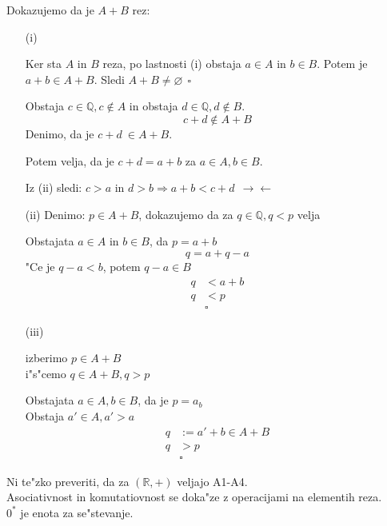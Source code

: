 Dokazujemo da je \(A + B\) rez:
\begin{enumerate}
	\item[(i)] 

	Ker sta \(A\) in \(B\) reza, po lastnosti (i) obstaja \(a \in A\) in \(b \in B\). Potem je \(a + b \in A + B\). Sledi \(A + B \neq \varnothing \ \ \square\)


	Obstaja \(c \in \mathbb{Q}, c \notin A\) in obstaja \(d \in \mathbb{Q}, d \notin B\).
	\[c + d \notin A + B\]
	Denimo, da je \(c + d\ \in A + B\).

	Potem velja, da je \(c + d = a + b\) za \(a \in A, b \in B\).

	Iz (ii) sledi: \(c > a\) in \(d > b \Rightarrow a + b < c + d \ \ \rightarrow\leftarrow\)

	\item[(ii)] Denimo: \(p \in A + B\), dokazujemo da za \(q \in \mathbb{Q}, q < p\) velja 

	Obstajata \(a \in A\) in \(b \in B\), da \(p = a + b\)
	\[q = a + q - a\]
	"Ce je \(q - a < b\), potem \(q - a \in B\)
	\begin{align*}
		q &< a + b\\
		q &< p\\
		&\square
	\end{align*}

	\item[(iii)] 

	izberimo \(p \in A + B\)\\
	i"s"cemo \(q \in A + B, q > p\)

	Obstajata \(a \in A, b \in B\), da je \(p = a _ b\)\\
	Obstaja \(a' \in A, a' > a\)
	\begin{align*}
		q &:= a' + b \in A + B\\
		q &> p\\
		&\square
	\end{align*}
\end{enumerate}

Ni te"zko preveriti, da za \((\mathbb{R}, +)\) veljajo A1-A4.\\
\hspace*{12pt}Asociativnost in komutatiovnost se doka"ze z operacijami na elementih reza.\\
\hspace*{12pt}\(0^*\) je enota za se"stevanje.

